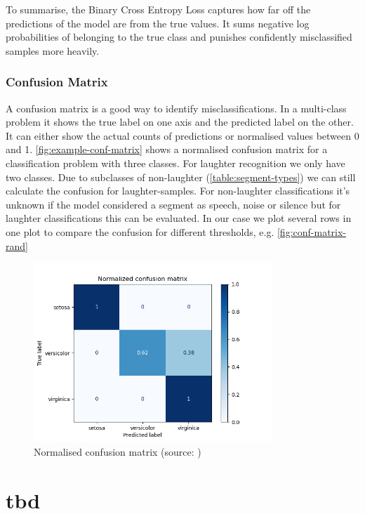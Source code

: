 \documentclass[bsc,frontabs,parskip,deptreport]{infthesis}
\begin{document}
To summarise, the Binary Cross Entropy Loss captures how far off the predictions of the model are from the true values. It sums negative log probabilities of belonging to the true class and punishes confidently misclassified samples more heavily.

\subsection{Confusion Matrix} \label{sec:conf-matrix}
A confusion matrix is a good way to identify misclassifications. In a multi-class problem it shows the true label on one axis and the predicted label on the other. It can either show the actual counts of predictions or normalised values between 0 and 1. \autoref{fig:example-conf-matrix} shows a normalised confusion matrix for a classification problem with three classes.
For laughter recognition we only have two classes. Due to subclasses of non-laughter (\autoref{table:segment-types}) we can still calculate the confusion for laughter-samples. For non-laughter classifications it's unknown if the model considered a segment as speech, noise or silence but for laughter classifications this can be evaluated. In our case we plot several rows in one plot to compare the confusion for different thresholds, e.g. \autoref{fig:conf-matrix-rand}
\begin{figure}
    \centering
    \includegraphics[width=9cm]{imgs/examples/exmaple_confusion_matrix.png}
    \caption{Normalised confusion matrix (source: \citeauthor{confmatrixscikit})}
    \label{fig:example-conf-matrix}
\end{figure}

\chapter{tbd} 
\end{document}
